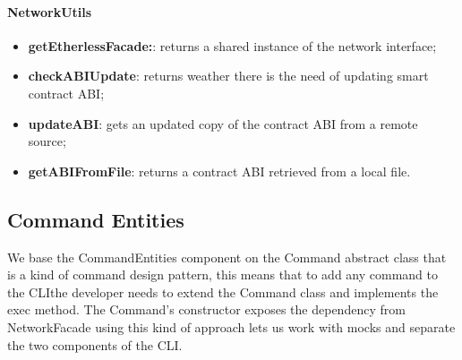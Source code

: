 \paragraph{NetworkUtils}
\begin{itemize}
    \item \textbf{getEtherlessFacade:}: returns a shared instance of the network interface;
    \item \textbf{checkABIUpdate}: returns weather there is the need of updating smart contract ABI;
    \item \textbf{updateABI}: gets an updated copy of the contract ABI from a remote source;
    \item \textbf{getABIFromFile}: returns a contract ABI retrieved from a local file.
\end{itemize}
\newpage
\subsection{Command Entities}
We base the CommandEntities component on the Command abstract class that is a kind of command design pattern, this means that to add any command to the CLI\glo the developer needs to extend the Command class and implements the exec method.
The Command's constructor exposes the dependency from NetworkFacade using this kind of approach lets us work with mocks and separate the two components of the CLI\glo.
